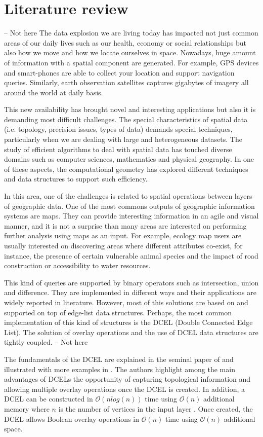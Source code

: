 \section{Literature review}
-- Not here
The data explosion we are living today has impacted not just common areas of our daily lives such as our health, economy or social relationships but also how we move and how we locate ourselves in space.  Nowadays, huge amount of information with a spatial component are generated.  For example, GPS devices and smart-phones are able to collect your location and support navigation queries.  Similarly, earth observation satellites captures gigabytes of imagery all around the world at daily basis.

This new availability has brought novel and interesting applications but also it is demanding most difficult challenges.  The special characteristics of spatial data (i.e. topology, precision issues, types of data) demands special techniques, particularly when we are dealing with large and heterogeneous datasets.  The study of efficient algorithms to deal with spatial data has touched diverse domains such as computer sciences, mathematics and physical geography.  In one of these aspects, the computational geometry has explored different techniques and data structures to support such efficiency.

In this area, one of the challenges is related to spatial operations between layers of geographic data.  One of the most commons outputs of geographic information systems are maps.  They can provide interesting information in an agile and visual manner, and it is not a surprise than many areas are interested on performing further analysis using maps as an input.  For example, ecology map users are usually interested on discovering areas where different attributes co-exist, for instance, the presence of certain vulnerable animal species and the impact of road construction or accessibility to water resources.  

This kind of queries are supported by binary operators such as intersection, union and difference.  They are implemented in different ways and their applications are widely reported in literature.  However, most of this solutions are based on and supported on top of edge-list data structures.  Perhaps, the most common implementation of this kind of structures is the DCEL (Double Connected Edge List).  The solution of overlay operations and the use of DCEL data structures are tightly coupled.
-- Not here

The fundamentals of the DCEL are explained in the seminal paper of \cite{muller_finding_1978} and illustrated with more examples in \cite{preparata_computational_1985}.  The authors highlight among the main advantages of DCELs the opportunity of capturing topological information and allowing multiple overlay operations once the DCEL is created.  In addition, a DCEL can be constructed in $\mathcal{O}(n log(n))$ time using $\mathcal{O}(n)$ additional memory where $n$ is the number of vertices in the input layer \cite{freiseisen_colored_1998}. Once created, the DCEL allows Boolean overlay operations in $\mathcal{O}(n)$ time using $\mathcal{O}(n)$ additional space. 


